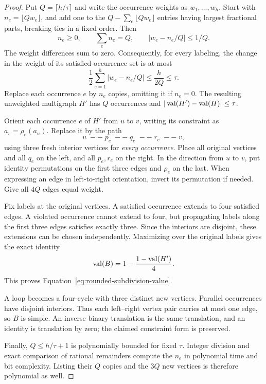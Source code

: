 \begin{proof}
Put $Q=\lceil h/\tau\rceil$ and write the occurrence weights as
$w_1,\ldots,w_h$.  Start with
$n_e=\lfloor Qw_e\rfloor$, and add one to the
$Q-\sum_e\lfloor Qw_e\rfloor$ entries having largest fractional parts,
breaking ties in a fixed order.  Then
\[
 n_e\ge0,\qquad \sum_e n_e=Q,\qquad
 |w_e-n_e/Q|\le1/Q.
\]
The weight differences sum to zero.  Consequently, for every labeling,
the change in the weight of its satisfied-occurrence set is at most
\[
 \frac12\sum_{e=1}^h|w_e-n_e/Q|
 \le\frac{h}{2Q}\le\tau.
\]
Replace each occurrence $e$ by $n_e$ copies, omitting it if $n_e=0$.
The resulting unweighted multigraph $H'$ has $Q$ occurrences and
$|\operatorname{val}(H')-\operatorname{val}(H)|\le\tau$.

Orient each occurrence $e$ of $H'$ from $u$ to $v$, writing its
constraint as $a_v=\rho_e(a_u)$.  Replace it by the path
\[
 u\;--\;p_e\;--\;q_e\;--\;r_e\;--\;v,
\]
using three fresh interior vertices for \emph{every occurrence}.
Place all original vertices and all $q_e$ on the left, and all
$p_e,r_e$ on the right.  In the direction from $u$ to $v$, put identity
permutations on the first three edges and $\rho_e$ on the last.
When expressing an edge in left-to-right orientation, invert its
permutation if needed.  Give all $4Q$ edges equal weight.

Fix labels at the original vertices.  A satisfied occurrence extends
to four satisfied edges.  A violated occurrence cannot extend to four,
but propagating labels along the first three edges satisfies exactly
three.  Since the interiors are disjoint, these extensions can be
chosen independently.  Maximizing over the original labels gives the
exact identity
\begin{equation}
 \operatorname{val}(B)=1-\frac{1-\operatorname{val}(H')}{4}.
 \label{eq:bipartization-value}
\end{equation}
This proves Equation~\eqref{eq:rounded-subdivision-value}.

A loop becomes a four-cycle with three distinct new vertices.
Parallel occurrences have disjoint interiors.  Thus each left--right
vertex pair carries at most one edge, so $B$ is simple.  An inverse
binary translation is the same translation, and an identity is
translation by zero; the claimed constraint form is preserved.

Finally, $Q\le h/\tau+1$ is polynomially bounded for fixed $\tau$.
Integer division and exact comparison of rational remainders compute
the $n_e$ in polynomial time and bit complexity.  Listing their $Q$
copies and the $3Q$ new vertices is therefore polynomial as well.
\end{proof}


